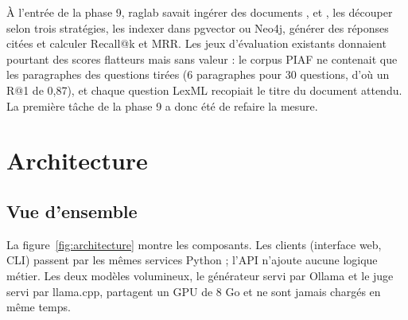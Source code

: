 \documentclass[11pt,a4paper]{article}
\newcommand{\code}[1]{\texttt{\detokenize{#1}}}
\begin{document}
À l'entrée de la phase 9, raglab savait ingérer des documents \code{.txt}, \code{.pdf} et \code{.docx}, les découper selon trois stratégies, les indexer dans pgvector ou Neo4j, générer des réponses citées et calculer Recall@k et MRR. Les jeux d'évaluation existants donnaient pourtant des scores flatteurs mais sans valeur : le corpus PIAF ne contenait que les paragraphes des questions tirées (6 paragraphes pour 30 questions, d'où un R@1 de 0,87), et chaque question LexML recopiait le titre du document attendu. La première tâche de la phase 9 a donc été de refaire la mesure.

\section{Architecture}

\subsection{Vue d'ensemble}

La figure~\ref{fig:architecture} montre les composants. Les clients (interface web, CLI) passent par les mêmes services Python ; l'API n'ajoute aucune logique métier. Les deux modèles volumineux, le générateur servi par Ollama et le juge servi par llama.cpp, partagent un GPU de 8 Go et ne sont jamais chargés en même temps.
\end{document}
